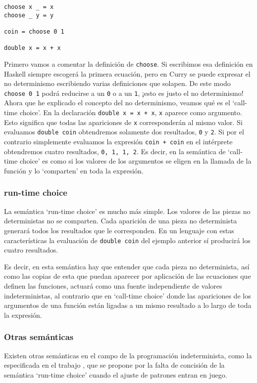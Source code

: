 \documentclass[class=article, crop=false]{standalone}
\begin{document}
\begin{verbatim}
choose x _ = x
choose _ y = y

coin = choose 0 1

double x = x + x
\end{verbatim}

Primero vamos a comentar la definición de \verb`choose`. Si escribimos esa definición en
Haskell siempre escogerá la primera ecuación, pero en Curry se puede expresar el no
determinismo escribiendo varias definiciones que solapen. De este modo \verb`choose 0 1`
podrá reducirse a un \verb`0` o a un \verb`1`, ¡esto es justo el no determinismo! Ahora que
he explicado el concepto del no determinismo, veamos qué es el `call-time choice'. En la
declaración \verb`double x = x + x`, \verb`x` aparece como argumento. Esto significa que
todas las apariciones de \verb`x` corresponderán al mismo valor. Si evaluamos
\verb`double coin` obtendremos solamente dos resultados, \verb`0` y \verb`2`. Si por el
contrario simplemente evaluamos la expresión \verb`coin + coin` en el intérprete obtendremos
cuatro resultados, \verb`0, 1, 1, 2`. Es decir, en la semántica de `call-time choice' es como
si los valores de los argumentos se eligen en la llamada de la función y lo `comparten' en
toda la expresión.

\subsubsection{run-time choice}
La semántica `run-time choice' es mucho más simple. Los valores de las piezas no
deterministas no se comparten. Cada aparición de una pieza no determinista generará todos los
resultados que le corresponden. En un lenguaje con estas características la evaluación de
\verb`double coin` del ejemplo anterior sí producirá los cuatro resultados.

Es decir, en esta semántica hay que entender que cada pieza no determinista, así como las
copias de esta que puedan aparecer por aplicación de las ecuaciones que definen las
funciones, actuará como una fuente independiente de valores indeterministas, al contrario que
en `call-time choice' donde las apariciones de los argumentos de una función están ligadas a
un mismo resultado a lo largo de toda la expresión.

\subsubsection{Otras semánticas}
Existen otras semánticas en el campo de la programación indeterminista, como la especificada
en el trabajo \cite{riesco2014singular}, que se propone por la falta de concisión de la
semántica `run-time choice' cuando el ajuste de patrones entran en juego.
\end{document}

